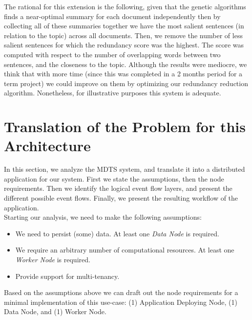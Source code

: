 \documentclass[12pt, titlepage]{uo_temp}
\begin{document}
     The rational for this extension is the following, given that the genetic algorithms
     finds a near-optimal summary for each document independently then by collecting all
     of these summaries together we have the most salient sentences (in relation to the
     topic) across all documents. Then, we remove the number of less salient sentences for
     which the redundancy score was the highest. The score was computed with respect to
     the number of overlapping words between two sentences, and the closeness to the
     topic. Although the results were mediocre, we think that with more time (since this
     was completed in a 2 months period for a term project) we could improve on them by
     optimizing our redundancy reduction algorithm. Nonetheless, for illustrative purposes
     this system is adequate.
     
     \section{Translation of the Problem for this Architecture}
     In this section, we analyze the MDTS system, and translate it into a distributed
     application for our system. First we state the assumptions, then the node
     requirements. Then we identify the logical event flow layers, and present the
     different possible event flows. Finally, we present the resulting workflow of the
     application.\\

     Starting our analysis, we need to make the following assumptions:
     \begin{itemize}
     \item We need to persist (some) data. At least one \emph{Data Node} is required.
     \item We require an arbitrary number of computational resources. At least one
       \emph{Worker Node} is required.
     \item Provide support for multi-tenancy.
     \end{itemize}

     Based on the assumptions above we can draft out the node requirements for a minimal
     implementation of this use-case: (1) Application Deploying Node, (1) Data Node, and
     (1) Worker Node.
     
\end{document}
